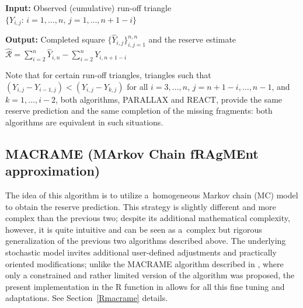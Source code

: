 \begin{algorithm}[!htb]%
\caption{REACT}\label{alg2}

{\bf Input: } Observed (cumulative) run-off triangle $\{Y_{i, j}:\,i = 1, \dots, n,\,j = 1, \dots, n+1-i\}$\\%

{\bf Output: } Completed square $\{\widehat{Y}_{i, j}\}_{i,j = 1}^{n,n}$ and the reserve estimate $\widehat{\mathcal{R}} = \sum_{i = 2}^n \widehat{Y}_{i,n} - \sum_{i = 2}^n Y_{i, n + 1 - i}$ 
\end{algorithm}

Note that for certain run-off triangles, triangles such that $(Y_{i,j} - Y_{i -1, j}) < (Y_{i, j} - Y_{k, j})$ for all $i = 3, \dots, n$, $j = n + 1 - i, \dots, n - 1$, and $k = 1, \dots, i - 2$, both algorithms, PARALLAX and REACT, provide the same reserve prediction and the same completion of the missing fragments: both algorithms are equivalent in such situations. 

\subsection{MACRAME {\rm (\textbf{MA}rkov \textbf{C}hain f\textbf{RA}g\textbf{ME}nt approximation)}}
\label{theory_macrame}
The idea of this algorithm is to utilize a~homogeneous Markov chain (MC) model to obtain the reserve prediction. This strategy is slightly different and more complex than the previous two; despite its additional mathematical complexity, however, it is quite intuitive and can be seen as a~complex but rigorous generalization of the previous two algorithms described above. The underlying stochastic model invites additional user-defined adjustments and practically oriented modifications; unlike the MACRAME algorithm described in \cite{MMP2022}, where only a constrained and rather limited version of the algorithm was proposed, the present implementation in the R function  in  allows for all this fine tuning and adaptations. See Section~\ref{Rmacrame} details.

